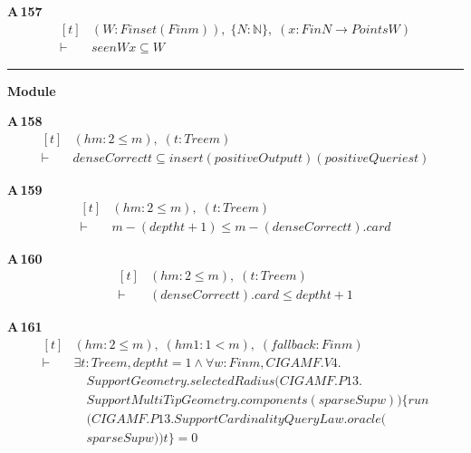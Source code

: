 \noindent\textbf{A\,157}\quad{}
{\footnotesize\[ \begin{aligned}[t]
&(\mathit{W} : \mathit{Finset} (\mathit{Fin} \mathit{m})),\; \{ \mathit{N} : \mathbb{N} \},\; (\mathit{x} : \mathit{Fin} \mathit{N} \to \mathit{Points} \mathit{W})\\
\vdash\;&\mathit{seen} \mathit{W} \mathit{x} \subseteq \mathit{W}
\end{aligned} \]}

\vspace{4pt}\noindent\rule{\columnwidth}{0.4pt}\par\vspace{2pt}
\noindent\textbf{Module }\par\vspace{3pt}

\noindent\textbf{A\,158}\quad{}
{\footnotesize\[ \begin{aligned}[t]
&(\mathit{hm} : 2 \leq \mathit{m}),\; (\mathit{t} : \mathit{Tree} \mathit{m})\\
\vdash\;&\mathit{denseCorrect} \mathit{t} \subseteq \mathit{insert} (\mathit{positiveOutput} \mathit{t}) (\mathit{positiveQueries} \mathit{t})
\end{aligned} \]}

\noindent\textbf{A\,159}\quad{}
{\footnotesize\[ \begin{aligned}[t]
&(\mathit{hm} : 2 \leq \mathit{m}),\; (\mathit{t} : \mathit{Tree} \mathit{m})\\
\vdash\;&\mathit{m} - (\mathit{depth} \mathit{t} + 1) \leq \mathit{m} - (\mathit{denseCorrect} \mathit{t}).\mathit{card}
\end{aligned} \]}

\noindent\textbf{A\,160}\quad{}
{\footnotesize\[ \begin{aligned}[t]
&(\mathit{hm} : 2 \leq \mathit{m}),\; (\mathit{t} : \mathit{Tree} \mathit{m})\\
\vdash\;&(\mathit{denseCorrect} \mathit{t}).\mathit{card} \leq \mathit{depth} \mathit{t} + 1
\end{aligned} \]}

\noindent\textbf{A\,161}\quad{}
{\footnotesize\[ \begin{aligned}[t]
&(\mathit{hm} : 2 \leq \mathit{m}),\; (\mathit{hm1} : 1 < \mathit{m}),\; (\mathit{fallback} : \mathit{Fin} \mathit{m})\\
\vdash\;&\exists \mathit{t} : \mathit{Tree} \mathit{m}, \mathit{depth} \mathit{t} = 1 \wedge \forall \mathit{w} : \mathit{Fin} \mathit{m}, \mathit{CIGAMF}.\mathit{V4}.\\
&\quad \mathit{SupportGeometry}.\mathit{selectedRadius} (\mathit{CIGAMF}.\mathit{P13}.\\
&\quad \mathit{SupportMultiTipGeometry}.\mathit{components} (\mathit{sparseSup} \mathit{w})) \{ \mathit{run}\\
&\quad (\mathit{CIGAMF}.\mathit{P13}.\mathit{SupportCardinalityQueryLaw}.\mathit{oracle} (\\
&\quad \mathit{sparseSup} \mathit{w})) \mathit{t}\} = 0
\end{aligned} \]}


